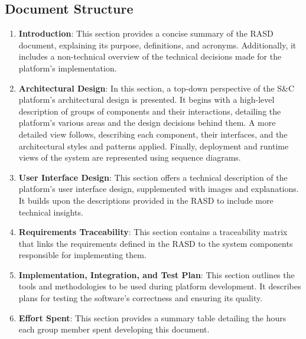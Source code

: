 \subsection{Document Structure}
\begin{enumerate} 
    \item \textcolor{titleColor}{\textbf{Introduction}}: This section provides a concise summary of the RASD document, explaining its purpose, definitions, and acronyms. Additionally, it includes a non-technical overview of the technical decisions made for the platform's implementation.
    \item \textcolor{titleColor}{\textbf{Architectural Design}}: In this section, a top-down perspective of the S\&C platform's architectural design is presented. It begins with a high-level description of groups of components and their interactions, detailing the platform's various areas and the design decisions behind them. A more detailed view follows, describing each component, their interfaces, and the architectural styles and patterns applied. Finally, deployment and runtime views of the system are represented using sequence diagrams. 
    \item \textcolor{titleColor}{\textbf{User Interface Design}}: This section offers a technical description of the platform's user interface design, supplemented with images and explanations. It builds upon the descriptions provided in the RASD to include more technical insights. 
    \item \textcolor{titleColor}{\textbf{Requirements Traceability}}: This section contains a traceability matrix that links the requirements defined in the RASD to the system components responsible for implementing them. 
    \item \textcolor{titleColor}{\textbf{Implementation, Integration, and Test Plan}}: This section outlines the tools and methodologies to be used during platform development. It describes plans for testing the software's correctness and ensuring its quality. 
    \item \textcolor{titleColor}{\textbf{Effort Spent}}: This section provides a summary table detailing the hours each group member spent developing this document. 
\end{enumerate}
